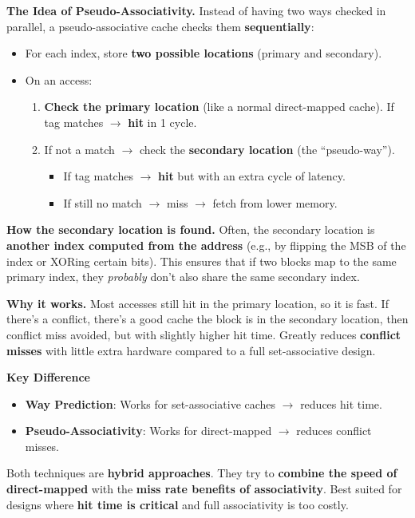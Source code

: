 \begin{itemize}
    \textcolor{Green3}{ \textbf{The Idea of Pseudo-Associativity.}} Instead of having two ways checked in parallel, a pseudo-associative cache checks them \textbf{sequentially}:
    \begin{itemize}
        \item For each index, store \textbf{two possible locations} (primary and secondary).
        \item On an access:
        \begin{enumerate}
            \item \textbf{Check the primary location} (like a normal direct-mapped cache). If tag matches $\rightarrow$ \textbf{hit} in 1 cycle.
            \item If not a match $\rightarrow$ check the \textbf{secondary location} (the ``pseudo-way'').
            \begin{itemize}
                \item If tag matches $\rightarrow$ \textbf{hit} but with an extra cycle of latency.
                \item If still no match $\rightarrow$ miss $\rightarrow$ fetch from lower memory.
            \end{itemize}
        \end{enumerate}
    \end{itemize}

    \textcolor{Green3}{ \textbf{How the secondary location is found.}} Often, the secondary location is \textbf{another index computed from the address} (e.g., by flipping the MSB of the index or XORing certain bits). This ensures that if two blocks map to the same primary index, they \emph{probably} don't also share the same secondary index.

    \textcolor{Green3}{ \textbf{Why it works.}} Most accesses still hit in the primary location, so it is fast. If there's a conflict, there's a good cache the block is in the secondary location, then conflict miss avoided, but with slightly higher hit time. Greatly reduces \textbf{conflict misses} with little extra hardware compared to a full set-associative design.
\end{itemize}

\begin{flushleft}
    \textcolor{Green3}{ \textbf{Key Difference}}
\end{flushleft}
\begin{itemize}
    \item \textbf{Way Prediction}: Works for set-associative caches $\rightarrow$ reduces hit time.
    \item \textbf{Pseudo-Associativity}: Works for direct-mapped $\rightarrow$ reduces conflict misses.
\end{itemize}
Both techniques are \textbf{hybrid approaches}. They try to \textbf{combine the speed of direct-mapped} with the \textbf{miss rate benefits of associativity}. Best suited for designs where \textbf{hit time is critical} and full associativity is too costly.